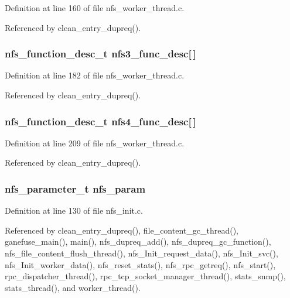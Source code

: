 Definition at line 160 of file nfs\_\-worker\_\-thread.c.

Referenced by clean\_\-entry\_\-dupreq().
\subsubsection{\setlength{\rightskip}{0pt plus 5cm}nfs\_\-function\_\-desc\_\-t {\bf nfs3\_\-func\_\-desc}[$\,$]}\label{nfs__dupreq_8c_a2}




Definition at line 182 of file nfs\_\-worker\_\-thread.c.

Referenced by clean\_\-entry\_\-dupreq().
\subsubsection{\setlength{\rightskip}{0pt plus 5cm}nfs\_\-function\_\-desc\_\-t {\bf nfs4\_\-func\_\-desc}[$\,$]}\label{nfs__dupreq_8c_a3}




Definition at line 209 of file nfs\_\-worker\_\-thread.c.

Referenced by clean\_\-entry\_\-dupreq().
\subsubsection{\setlength{\rightskip}{0pt plus 5cm}nfs\_\-parameter\_\-t {\bf nfs\_\-param}}\label{nfs__dupreq_8c_a0}




Definition at line 130 of file nfs\_\-init.c.

Referenced by clean\_\-entry\_\-dupreq(), file\_\-content\_\-gc\_\-thread(), ganefuse\_\-main(), main(), nfs\_\-dupreq\_\-add(), nfs\_\-dupreq\_\-gc\_\-function(), nfs\_\-file\_\-content\_\-flush\_\-thread(), nfs\_\-Init\_\-request\_\-data(), nfs\_\-Init\_\-svc(), nfs\_\-Init\_\-worker\_\-data(), nfs\_\-reset\_\-stats(), nfs\_\-rpc\_\-getreq(), nfs\_\-start(), rpc\_\-dispatcher\_\-thread(), rpc\_\-tcp\_\-socket\_\-manager\_\-thread(), stats\_\-snmp(), stats\_\-thread(), and worker\_\-thread().